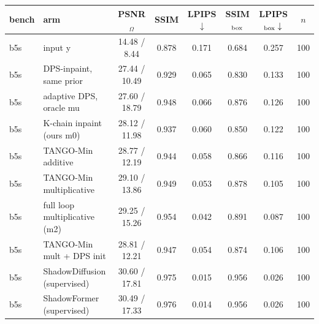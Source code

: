 \begin{tabular}{llcccccc}
\toprule
bench & arm & PSNR$_\Omega$ & SSIM & LPIPS$\downarrow$ & SSIM$_{\rm box}$ & LPIPS$_{\rm box}\downarrow$ & $n$\\
\midrule
b5s & input y & 14.48 / 8.44 & 0.878 & 0.171 & 0.684 & 0.257 & 100\\
b5s & DPS-inpaint, same prior & 27.44 / 10.49 & 0.929 & 0.065 & 0.830 & 0.133 & 100\\
b5s & adaptive DPS, oracle mu & 27.60 / 18.79 & 0.948 & 0.066 & 0.876 & 0.126 & 100\\
b5s & K-chain inpaint (ours m0) & 28.12 / 11.98 & 0.937 & 0.060 & 0.850 & 0.122 & 100\\
b5s & TANGO-Min additive & 28.77 / 12.19 & 0.944 & 0.058 & 0.866 & 0.116 & 100\\
b5s & TANGO-Min multiplicative & 29.10 / 13.86 & 0.949 & 0.053 & 0.878 & 0.105 & 100\\
b5s & full loop multiplicative (m2) & 29.25 / 15.26 & 0.954 & 0.042 & 0.891 & 0.087 & 100\\
b5s & TANGO-Min mult + DPS init & 28.81 / 12.21 & 0.947 & 0.054 & 0.874 & 0.106 & 100\\
b5s & ShadowDiffusion (supervised) & 30.60 / 17.81 & 0.975 & 0.015 & 0.956 & 0.026 & 100\\
b5s & ShadowFormer (supervised) & 30.49 / 17.33 & 0.976 & 0.014 & 0.956 & 0.026 & 100\\
\bottomrule
\end{tabular}
